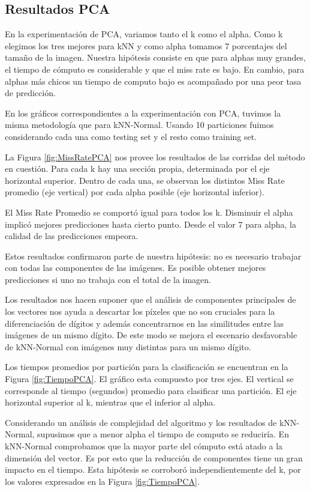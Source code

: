 \documentclass{article}
\begin{document}
\subsection*{Resultados PCA}

En la experimentación de PCA, variamos tanto el k como el alpha. Como k elegimos los tres mejores para kNN y como alpha tomamos 7 porcentajes del tamaño de la imagen. Nuestra hipótesis consiste en que para alphas muy grandes, el tiempo de cómputo es considerable y que el miss rate es bajo. En cambio, para alphas más chicos un tiempo de computo bajo es acompañado por una peor tasa de predicción. 

En los gráficos correspondientes a la experimentación con PCA, tuvimos la misma metodología que para kNN-Normal. Usando 10 particiones fuimos considerando cada una como testing set y el resto como training set.

La Figura \ref{fig:MissRatePCA} nos provee los resultados de las corridas del método en cuestión. Para cada k hay una sección propia, determinada por el eje horizontal superior. Dentro de cada una, se observan los distintos Miss Rate promedio (eje vertical) por cada alpha posible (eje horizontal inferior). 

El Miss Rate Promedio se comportó igual para todos los k. Disminuir el alpha implicó mejores predicciones hasta cierto punto. Desde el valor 7 para alpha, la calidad de las predicciones empeora. 

Estos resultados confirmaron parte de nuestra hipótesis: no es necesario trabajar con todas las componentes de las imágenes. Es posible obtener mejores predicciones si uno no trabaja con el total de la imagen. 

Los resultados nos hacen suponer que el análisis de componentes principales de los vectores nos ayuda a descartar los píxeles que no son cruciales para la diferenciación de dígitos y además concentrarnos en las similitudes entre las imágenes de un mismo dígito. De este modo se mejora el escenario desfavorable de kNN-Normal con imágenes muy distintas para un mismo dígito.


Los tiempos promedios por partición para la clasificación se encuentran en la Figura \ref{fig:TiempoPCA}. El gráfico esta compuesto por tres ejes. El vertical se corresponde al tiempo (segundos) promedio para clasificar una partición. El eje horizontal superior al k, mientras que el inferior al alpha. 

Considerando un análisis de complejidad del algoritmo y los resultados de kNN-Normal, supusimos que a menor alpha el tiempo de computo se reduciría. En kNN-Normal comprobamos que la mayor parte del cómputo está atado a la dimensión del vector. Es por esto que la reducción de componentes tiene un gran impacto en el tiempo. Esta hipótesis se corroboró independientemente del k, por los valores expresados en la Figura \ref{fig:TiempoPCA}.
\end{document}
